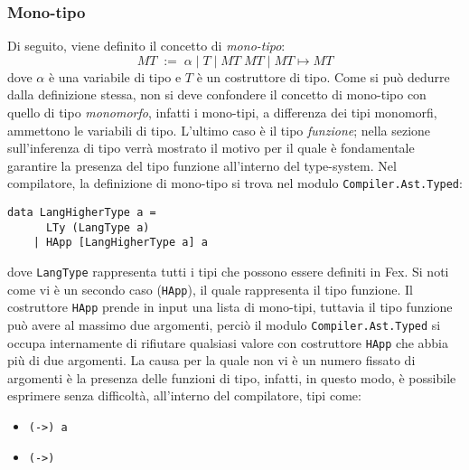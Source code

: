 \documentclass[10pt,a4paper]{article}
\begin{document}
\subsubsection{Mono-tipo}
Di seguito, viene definito il concetto di \textit{mono-tipo}:
\[ MT \; := \; \alpha \; | \; T \; | \; MT \; MT \; | \; MT \mapsto MT \]
dove $ \alpha $ è una variabile di tipo e $ T $ è un costruttore di tipo. Come si può dedurre dalla definizione stessa,
non si deve confondere
il concetto di mono-tipo con quello di tipo \textit{monomorfo}, infatti i mono-tipi, a differenza dei tipi monomorfi,
ammettono le variabili di tipo. L'ultimo caso è il tipo \textit{funzione}; nella sezione sull'inferenza di tipo verrà
mostrato il motivo per il quale è fondamentale garantire la presenza del tipo funzione all'interno del type-system.
Nel compilatore, la definizione di mono-tipo si trova nel modulo \texttt{Compiler.Ast.Typed}:
\begin{lstlisting}
data LangHigherType a =
      LTy (LangType a)
    | HApp [LangHigherType a] a
\end{lstlisting}
dove \texttt{LangType} rappresenta tutti i tipi che possono essere definiti in Fex. Si noti come vi è un secondo
caso (\texttt{HApp}), il quale rappresenta il tipo funzione. Il costruttore \texttt{HApp} prende in input una lista
di mono-tipi, tuttavia il tipo funzione può avere al massimo due argomenti, perciò il modulo \texttt{Compiler.Ast.Typed}
si occupa internamente di rifiutare qualsiasi valore con costruttore \texttt{HApp} che abbia più di due argomenti.
La causa per la quale non vi è un numero fissato di argomenti è la presenza delle funzioni di tipo, infatti,
in questo modo, è possibile esprimere senza difficoltà, all'interno del compilatore, tipi come:
\begin{itemize}
\item \texttt{(->) a}
\item \texttt{(->)}
\end{itemize}
\end{document}
